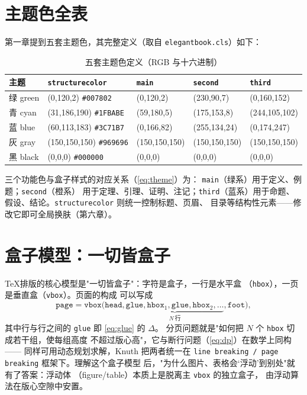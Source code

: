 \section{主题色全表}

第一章提到五套主题色，其完整定义（取自
\texttt{elegantbook.cls}）如下：

\begin{table}[htbp]
  \centering
  \caption{五套主题色定义（RGB 与十六进制）}\label{tab:colors}
  \begin{tabular}{lllll}
    \toprule
    主题 & \texttt{structurecolor} & \texttt{main} & \texttt{second} & \texttt{third} \\
    \midrule
    绿 green & (0,120,2) \texttt{\#007802} & (0,120,2) & (230,90,7) & (0,160,152) \\
    青 cyan  & (31,186,190) \texttt{\#1FBABE} & (59,180,5) & (175,153,8) & (244,105,102) \\
    蓝 blue  & (60,113,183) \texttt{\#3C71B7} & (0,166,82) & (255,134,24) & (0,174,247) \\
    灰 gray  & (150,150,150) \texttt{\#969696} & (150,150,150) & (150,150,150) & (150,150,150) \\
    黑 black & (0,0,0) \texttt{\#000000} & (0,0,0) & (0,0,0) & (0,0,0) \\
    \bottomrule
  \end{tabular}
\end{table}

三个功能色与盒子样式的对应关系（\eqref{eq:theme}）为：
\texttt{main}（绿系）用于定义、例题；\texttt{second}（橙系）
用于定理、引理、证明、注记；\texttt{third}（蓝系）用于命题、
假设、结论。\texttt{structurecolor} 则统一控制标题、页眉、
目录等结构性元素——修改它即可全局换肤（第六章）。

\section{盒子模型：一切皆盒子}

\TeX 排版的核心模型是"一切皆盒子"：字符是盒子，一行是水平盒
（\texttt{hbox}），一页是垂直盒（\texttt{vbox}）。页面的构成
可以写成
\begin{equation}
  \texttt{page} = \texttt{vbox}\bigl(
    \texttt{head}, \underbrace{\texttt{glue}, \texttt{hbox}_1, \texttt{glue}, \texttt{hbox}_2, \dots}_{N\ \text{行}},
    \texttt{foot} \bigr),
  \label{eq:pagebox}
\end{equation}
其中行与行之间的 \texttt{glue} 即 \eqref{eq:glue} 的 $\Delta$。
分页问题就是"如何把 $N$ 个 \texttt{hbox} 切成若干组，使每组高度
不超过版心高"，它与断行问题（\eqref{eq:dp}）在数学上同构——
同样可用动态规划求解，Knuth 把两者统一在
\texttt{line breaking / page breaking} 框架下。理解这个盒子模型
后，"为什么图片、表格会‘浮动’到别处"就有了答案：浮动体
（figure/table）本质上是脱离主 \texttt{vbox} 的独立盒子，
由浮动算法在版心空隙中安置。
